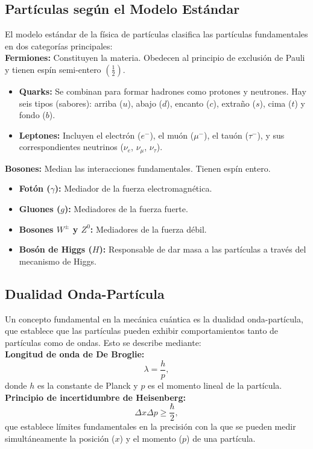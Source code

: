 \subsection*{Partículas según el Modelo Estándar}
\noindent
El modelo estándar de la física de partículas clasifica las partículas fundamentales en dos categorías principales:\\[0.5em]
\noindent
\textbf{Fermiones:} Constituyen la materia. Obedecen al principio de exclusión de Pauli y tienen espín semi-entero $(\frac{1}{2})$.
    \begin{itemize}
        \item \textbf{Quarks:} Se combinan para formar hadrones como protones y neutrones. Hay seis tipos (sabores): arriba ($u$), abajo ($d$), encanto ($c$), extraño ($s$), cima ($t$) y fondo ($b$).
        \item \textbf{Leptones:} Incluyen el electrón ($e^-$), el muón ($\mu^-$), el tauón ($\tau^-$), y sus correspondientes neutrinos ($\nu_e$, $\nu_\mu$, $\nu_\tau$).
    \end{itemize}
\noindent
\textbf{Bosones:} Median las interacciones fundamentales. Tienen espín entero.
    \begin{itemize}
        \item \textbf{Fotón ($\gamma$):} Mediador de la fuerza electromagnética.
        \item \textbf{Gluones ($g$):} Mediadores de la fuerza fuerte.
        \item \textbf{Bosones $W^\pm$ y $Z^0$:} Mediadores de la fuerza débil.
        \item \textbf{Bosón de Higgs ($H$):} Responsable de dar masa a las partículas a través del mecanismo de Higgs.
    \end{itemize}

\subsection*{Dualidad Onda-Partícula}
\noindent
Un concepto fundamental en la mecánica cuántica es la dualidad onda-partícula, que establece que las partículas pueden exhibir comportamientos tanto de partículas como de ondas. Esto se describe mediante:\\[0.5em]
\noindent
\textbf{Longitud de onda de De Broglie:}
    \[
    \lambda = \frac{h}{p},
    \]
    donde $h$ es la constante de Planck y $p$ es el momento lineal de la partícula.\\[0.5em]
\noindent
\textbf{Principio de incertidumbre de Heisenberg:}
    \[
    \Delta x \Delta p \geq \frac{\hbar}{2},
    \]
    que establece límites fundamentales en la precisión con la que se pueden medir simultáneamente la posición ($x$) y el momento ($p$) de una partícula.


